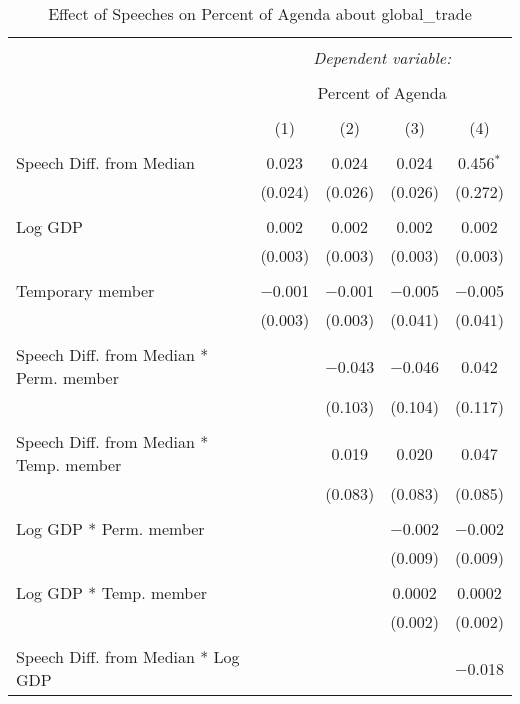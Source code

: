 
\begin{table}[!htbp] \centering 
  \caption{Effect of Speeches on Percent of Agenda about global_trade} 
  \label{} 
\begin{tabular}{@{\extracolsep{5pt}}lcccc} 
\\[-1.8ex]\hline 
\hline \\[-1.8ex] 
 & \multicolumn{4}{c}{\textit{Dependent variable:}} \\ 
\cline{2-5} 
\\[-1.8ex] & \multicolumn{4}{c}{Percent of Agenda} \\ 
\\[-1.8ex] & (1) & (2) & (3) & (4)\\ 
\hline \\[-1.8ex] 
 Speech Diff. from Median & 0.023 & 0.024 & 0.024 & 0.456$^{*}$ \\ 
  & (0.024) & (0.026) & (0.026) & (0.272) \\ 
  & & & & \\ 
 Log GDP & 0.002 & 0.002 & 0.002 & 0.002 \\ 
  & (0.003) & (0.003) & (0.003) & (0.003) \\ 
  & & & & \\ 
 Temporary member & $-$0.001 & $-$0.001 & $-$0.005 & $-$0.005 \\ 
  & (0.003) & (0.003) & (0.041) & (0.041) \\ 
  & & & & \\ 
 Speech Diff. from Median * Perm. member &  & $-$0.043 & $-$0.046 & 0.042 \\ 
  &  & (0.103) & (0.104) & (0.117) \\ 
  & & & & \\ 
 Speech Diff. from Median * Temp. member &  & 0.019 & 0.020 & 0.047 \\ 
  &  & (0.083) & (0.083) & (0.085) \\ 
  & & & & \\ 
 Log GDP * Perm. member &  &  & $-$0.002 & $-$0.002 \\ 
  &  &  & (0.009) & (0.009) \\ 
  & & & & \\ 
 Log GDP * Temp. member &  &  & 0.0002 & 0.0002 \\ 
  &  &  & (0.002) & (0.002) \\ 
  & & & & \\ 
 Speech Diff. from Median * Log GDP &  &  &  & $-$0.018 \\ 

\end{tabular}
\end{table}
